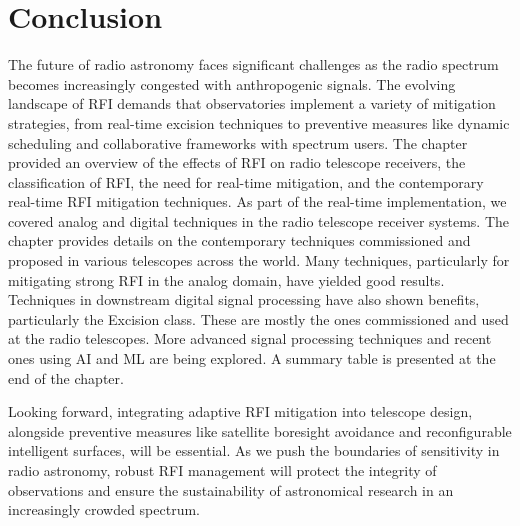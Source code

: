 \section{Conclusion}
\label{section:hardware:conclusion}

The future of radio astronomy faces significant challenges as the radio spectrum becomes increasingly congested with anthropogenic signals. The evolving landscape of RFI demands that observatories implement a variety of mitigation strategies, from real-time excision techniques to preventive measures like dynamic scheduling and collaborative frameworks with spectrum users.
The chapter provided an overview of the effects of RFI on radio telescope receivers, the classification of RFI, the need for real-time mitigation, and the contemporary real-time RFI mitigation techniques. As part of the real-time implementation, we covered analog and digital techniques in the radio telescope receiver systems. The chapter provides details on the contemporary techniques commissioned and proposed in various telescopes across the world. Many techniques, particularly for mitigating strong RFI in the analog domain, have yielded good results. Techniques in downstream digital signal processing have also shown benefits, particularly the Excision class. These are mostly the ones commissioned and used at the radio telescopes. More advanced signal processing techniques and recent ones using AI and ML are being explored. A summary table is presented at the end of the chapter.

Looking forward, integrating adaptive RFI mitigation into telescope design, alongside preventive measures like satellite boresight avoidance and reconfigurable intelligent surfaces, will be essential. As we push the boundaries of sensitivity in radio astronomy, robust RFI management will protect the integrity of observations and ensure the sustainability of astronomical research in an increasingly crowded spectrum.


